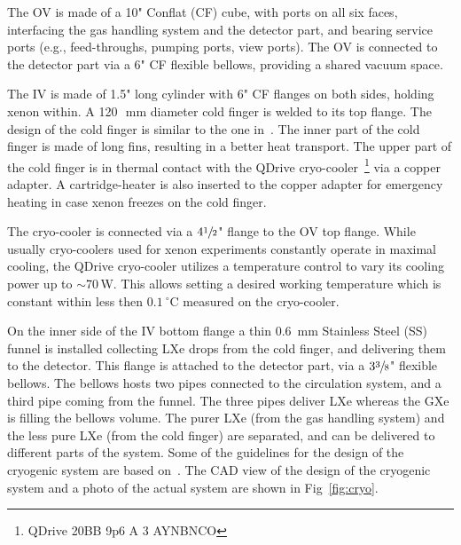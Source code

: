 The OV is made of a 10" Conflat (CF) cube, with ports on all six faces, interfacing the gas handling system and  the detector part, and bearing service ports (e.g., feed-throughs, pumping ports, 
view ports). The OV is connected to the detector part via a 6" CF flexible bellows, providing a shared vacuum space.

The IV is made of 1.5" long cylinder with 6" CF flanges on both sides, holding xenon within. A 120~\,mm diameter cold finger is welded to its top flange. The design of the cold finger is similar to the one in~\cite{xe100_instr2012}. The inner part of the cold finger is made of long fins, resulting in a better heat transport.  The upper part of the cold finger is in thermal contact with the 
QDrive cryo-cooler~\footnote{QDrive 20BB 9p6 A 3 AYNBNCO} via a copper adapter.  
A cartridge-heater 
is also inserted to the copper adapter for emergency heating in case xenon freezes on the 
cold finger. 

The cryo-cooler is connected via a $4\sfrac{1}{2}$" 
flange to the OV top flange. While usually cryo-coolers used for 
xenon experiments constantly operate in maximal cooling, the QDrive cryo-cooler utilizes a 
temperature control to vary its cooling power up to $\sim$70\,W. This allows setting a desired working temperature which is constant within less then $0.1~\mathrm{^{\circ}C}$ measured on the cryo-cooler.

On the inner side of the IV bottom flange a thin 0.6~mm Stainless Steel (SS) funnel is installed 
collecting LXe drops from the cold finger, and delivering them to the  detector. This flange is attached to the detector part, via a $3\sfrac{3}{8}$" flexible bellows. The 
bellows hosts two pipes connected to the circulation system, and a third pipe coming 
from the funnel. The three pipes deliver LXe whereas the GXe is filling the bellows volume. The purer LXe (from the gas handling system) and the less pure LXe (from the cold finger) are separated, and can be delivered to different parts of the system. Some of the guidelines for the design of 
the cryogenic system are based on~\cite{Giboni}. The CAD view of 
the design of the cryogenic system and a photo of the actual system are shown in Fig~\ref{fig:cryo}. 

